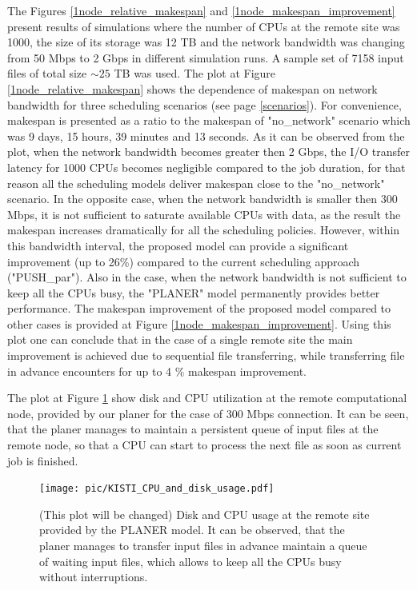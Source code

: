 \documentclass{svjour3}                     %
\begin{document}
The Figures \ref{1node_relative_makespan} and \ref{1node_makespan_improvement} present results of simulations where the number of CPUs at the remote site was 1000, the size of its storage was 12 TB and the network bandwidth was changing from 50 Mbps to 2 Gbps in different simulation runs. A sample set of 7158 input files of total size $\sim25$ TB was used. The plot at Figure \ref{1node_relative_makespan} shows the dependence of makespan on network bandwidth for three scheduling scenarios (see page \ref{scenarios}). For convenience, makespan is presented as a ratio to the makespan of "no\_network" scenario which was 9 days, 15 hours, 39 minutes and 13 seconds. As it can be observed from the plot, when the network bandwidth becomes greater then 2 Gbps, the I/O transfer latency for 1000 CPUs becomes negligible compared to the job duration, for that reason all the scheduling models deliver makespan close to the "no\_network" scenario. In the opposite case, when the network bandwidth is smaller then 300 Mbps, it is not sufficient to saturate available CPUs with data, as the result the makespan increases dramatically for all the scheduling policies. However, within this bandwidth interval, the proposed model can provide a significant improvement (up to 26\%) compared to the current scheduling approach ("PUSH\_par"). Also in the case, when the network bandwidth is not sufficient to keep all the CPUs busy, the "PLANER" model permanently provides better performance. The makespan improvement of the proposed model compared to other cases is provided at Figure \ref{1node_makespan_improvement}. Using this plot one can conclude that in the case of a single remote site the main improvement is achieved due to sequential file transferring, while transferring file in advance encounters for up to 4 \% makespan improvement.

The plot at Figure \ref{utilization} show disk and CPU utilization at the remote computational node, provided by our planer for the case of 300 Mbps connection. It can be seen, that the planer manages to maintain a persistent queue of input files at the remote node, so that a CPU can start to process the next file as soon as current job is finished.

\begin{figure}[h]
\centering
    \texttt{[image: pic/KISTI\_CPU\_and\_disk\_usage.pdf]}
    \caption{(This plot will be changed) Disk and CPU usage at the remote site provided by the PLANER model. It can be observed, that the planer manages to transfer input files in advance maintain a queue of waiting input files, which allows to keep all the CPUs busy without interruptions.}
    \label{utilization}
\end{figure}
\end{document}
